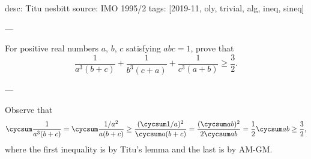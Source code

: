 desc: Titu nesbitt
source: IMO 1995/2
tags: [2019-11, oly, trivial, alg, ineq, sineq]

---

For positive real numbers $a$, $b$, $c$ satisfying $abc=1$, prove that \[\frac1{a^3(b+c)}+\frac1{b^3(c+a)}+\frac1{c^3(a+b)}\ge\frac32.\]

---

Observe that \[\cycsum\frac1{a^3(b+c)}=\cycsum\frac{1/a^2}{a(b+c)}\ge\frac{(\cycsum 1/a)^2}{\cycsum a(b+c)}=\frac{(\cycsum ab)^2}{2\cycsum ab}=\frac12\cycsum ab\ge\frac32,\]
where the first inequality is by Titu's lemma and the last is by AM-GM.

